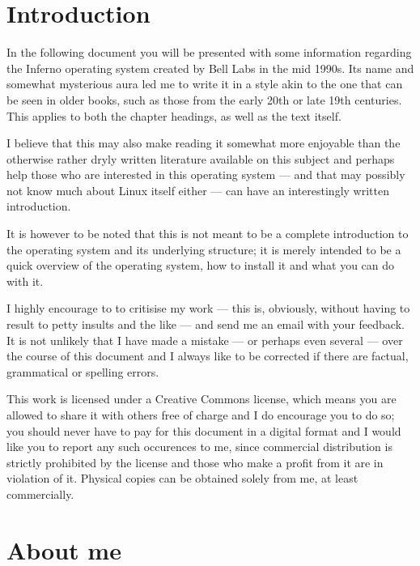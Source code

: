 \documentclass[a5paper,twoside,12pt]{report}
\begin{document}
\tableofcontents
\newpage

\chapter*{Introduction}
In the following document you will be presented with some information regarding the Inferno operating system created by Bell Labs in the mid 1990s. Its name and somewhat mysterious aura led me to write it in a style akin to the one that can be seen in older books, such as those from the early 20th or late 19th centuries. This applies to both the chapter headings, as well as the text itself.

I believe that this may also make reading it somewhat more enjoyable than the otherwise rather dryly written literature available on this subject and perhaps help those who are interested in this operating system — and that may possibly not know much about Linux itself either — can have an interestingly written introduction.

It is however to be noted that this is not meant to be a complete introduction to the operating system and its underlying structure; it is merely intended to be a quick overview of the operating system, how to install it and what you can do with it.

I highly encourage to to critisise my work — this is, obviously, without having to result to petty insults and the like — and send me an email with your feedback. It is not unlikely that I have made a mistake — or perhaps even several — over the course of this document and I always like to be corrected if there are factual, grammatical or spelling errors.

This work is licensed under a Creative Commons license, which means you are allowed to share it with others free of charge and I do encourage you to do so; you should never have to pay for this document in a digital format and I would like you to report any such occurences to me, since commercial distribution is strictly prohibited by the license and those who make a profit from it are in violation of it. Physical copies can be obtained solely from me, at least commercially. 

\newpage

\chapter*{About me}
\end{document}
